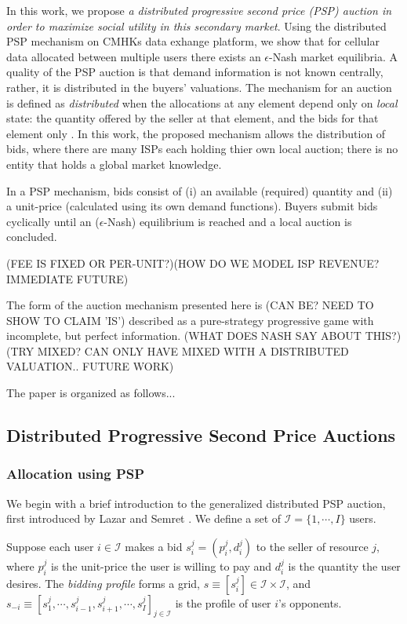 \documentclass[12pt]{article}
\theoremstyle{definition}
\newcommand{\mcI}{\mathcal{I}}
\begin{document}
\begin{multicols}{2}
In this work, we propose \emph{a distributed progressive second price (PSP) auction in
order to maximize social utility in this secondary market}. Using the
distributed PSP mechanism on CMHKs data
exhange platform, we show that for cellular data allocated between multiple users there
exists an $\epsilon$-Nash market equilibria. A quality of the PSP auction is that
demand information is not known centrally, rather, it is distributed in the
buyers' valuations. The mechanism for an auction is defined
as \emph{distributed} when the allocations at any element depend only on
\emph{local} state: the quantity offered by the seller at that element, and the
bids for that element only \cite{lazar}. In this work, the proposed mechanism
allows the distribution of bids, where there are many ISPs each holding
thier own local auction; there is no entity that holds a global market knowledge.

In a PSP mechanism, bids consist of (i) an available (required) quantity and (ii) a unit-price (calculated
using its own demand functions). Buyers submit bids cyclically until an
($\epsilon$-Nash) equilibrium is reached and a local auction is concluded. 

(FEE IS FIXED OR
PER-UNIT?)(HOW DO WE MODEL ISP REVENUE? IMMEDIATE FUTURE)

The form of the auction mechanism presented here is (CAN BE? NEED TO SHOW TO
CLAIM 'IS') described as a
pure-strategy progressive game with incomplete, but perfect information. (WHAT
DOES NASH SAY ABOUT THIS?) (TRY MIXED? CAN ONLY HAVE MIXED WITH A DISTRIBUTED
VALUATION.. FUTURE WORK) 

The paper is organized as follows...

\subsection{Distributed Progressive Second Price Auctions}

\subsubsection{Allocation using PSP}

We begin with a brief introduction to the generalized distributed PSP auction, first introduced by Lazar and Semret \cite{lazar}.
We define a set of $\mcI = \lbrace 1,\cdots,I\rbrace$ users.

Suppose each user $i \in \mcI$ makes a bid $s_i^j = (p_i^j, d_i^j)$ to the
seller of resource $j$, where $p_i^j$ is the unit-price the user is willing to
pay and $d_i^j$ is the quantity the user desires. The \emph{bidding profile} forms a grid, $s \equiv
[s_i^j] \in \mcI \times \mcI$, and $s_{-i} \equiv [s_1^j , \cdots , s_{i−1}^j , s_{i+1}^j , \cdots
, s_I^j]_{j\in\mcI}$ is the profile of user $i$'s opponents. 


\end{multicols}
\end{document}
